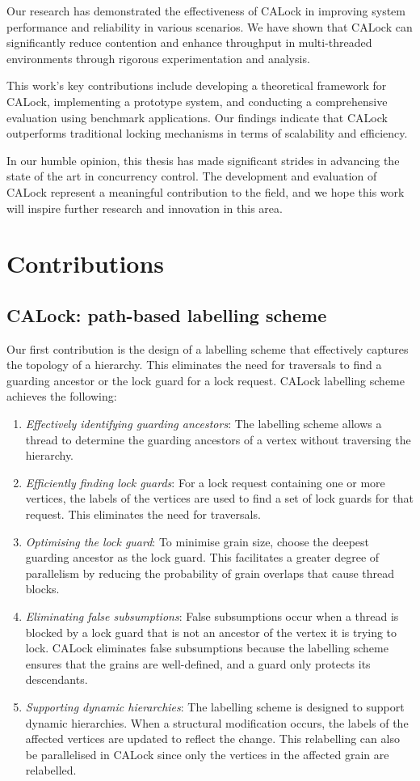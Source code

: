 Our research has demonstrated the effectiveness of CALock in improving system performance and reliability in various scenarios. We have shown that CALock can significantly reduce contention and enhance throughput in multi-threaded environments through rigorous experimentation and analysis.

This work's key contributions include developing a theoretical framework for CALock, implementing a prototype system, and conducting a comprehensive evaluation using benchmark applications. Our findings indicate that CALock outperforms traditional locking mechanisms in terms of scalability and efficiency.


In our humble opinion, this thesis has made significant strides in advancing the state of the art in concurrency control. The development and evaluation of CALock represent a meaningful contribution to the field, and we hope this work will inspire further research and innovation in this area.
\section{Contributions}

\subsection{CALock: path-based labelling scheme}
Our first contribution is the design of a labelling scheme that effectively captures the topology of a hierarchy. This eliminates the need for traversals to find a guarding ancestor or the lock guard for a lock request. CALock labelling scheme achieves the following: 

\begin{enumerate}
    \item \emph{Effectively identifying guarding ancestors}: The labelling scheme allows a thread to determine the guarding ancestors of a vertex without traversing the hierarchy.
    \item \emph{Efficiently finding lock guards}: For a lock request containing one or more vertices, the labels of the vertices are used to find a set of lock guards for that request. This eliminates the need for traversals. 
    \item \emph{Optimising the lock guard}: To minimise grain size, choose the deepest guarding ancestor as the lock guard. This facilitates a greater degree of parallelism by reducing the probability of grain overlaps that cause thread blocks.
    \item \emph{Eliminating false subsumptions}: False subsumptions occur when a thread is blocked by a lock guard that is not an ancestor of the vertex it is trying to lock. CALock eliminates false subsumptions because the labelling scheme ensures that the grains are well-defined, and a guard only protects its descendants.
    \item \emph{Supporting dynamic hierarchies}: The labelling scheme is designed to support dynamic hierarchies. When a structural modification occurs, the labels of the affected vertices are updated to reflect the change. This relabelling can also be parallelised in CALock since only the vertices in the affected grain are relabelled. 
\end{enumerate}


